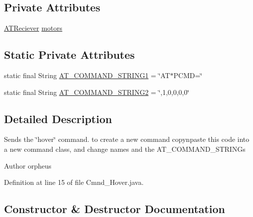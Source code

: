 \subsection*{Private Attributes}
\begin{DoxyCompactItemize}
\item 
\hyperlink{class_drone_1_1_hardware_1_1_a_t_reciever}{A\+T\+Reciever} \hyperlink{class_drone_1_1_drone_commands_1_1_cmnd___hover_ac1a7b5271784b61c9f20d811fcdac401}{motors}
\end{DoxyCompactItemize}
\subsection*{Static Private Attributes}
\begin{DoxyCompactItemize}
\item 
static final String \hyperlink{class_drone_1_1_drone_commands_1_1_cmnd___hover_a20441bc1e48cb90f898f805410872766}{A\+T\+\_\+\+C\+O\+M\+M\+A\+N\+D\+\_\+\+S\+T\+R\+I\+N\+G1} = \char`\"{}A\+T$\ast$P\+C\+M\+D=\char`\"{}
\item 
static final String \hyperlink{class_drone_1_1_drone_commands_1_1_cmnd___hover_a617bce0e87944c82c0a1199d405d5301}{A\+T\+\_\+\+C\+O\+M\+M\+A\+N\+D\+\_\+\+S\+T\+R\+I\+N\+G2} = \char`\"{},1,0,0,0,0\char`\"{}
\end{DoxyCompactItemize}


\subsection{Detailed Description}
Sends the \char`\"{}hover\char`\"{} command. to create a new command copy\textquotesingle{}n\textquotesingle{}paste this code into a new command class, and change names and the A\+T\+\_\+\+C\+O\+M\+M\+A\+N\+D\+\_\+\+S\+T\+R\+I\+N\+G\textquotesingle{}s \begin{DoxyAuthor}{Author}
orpheus 
\end{DoxyAuthor}


Definition at line 15 of file Cmnd\+\_\+\+Hover.\+java.



\subsection{Constructor \& Destructor Documentation}
\hypertarget{class_drone_1_1_drone_commands_1_1_cmnd___hover_a6bc2451caafbd0c40abad53a1134b487}{}

